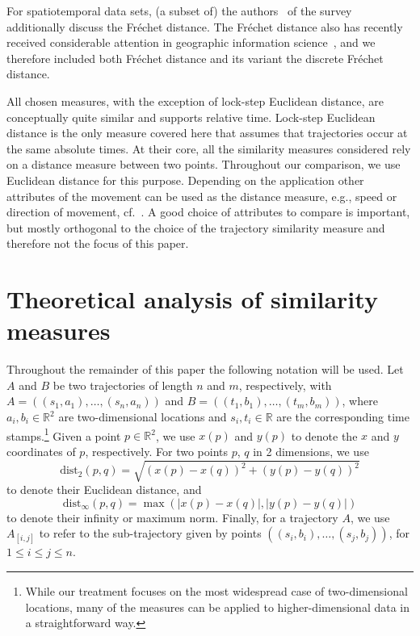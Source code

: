 \documentclass{interact}
\newcommand{\R}{\ensuremath{\mathbb{R}}}
\newcommand{\dist}{\ensuremath{\text{dist}}}
\begin{document}
For spatiotemporal data sets, (a subset of) the authors~\citep{gunopulos2012similarity} of the survey additionally discuss the Fr\'echet distance. The Fr\'echet distance also has recently received considerable attention in geographic information science~\citep{werner2018acm}, and we therefore included both Fr\'echet distance and its variant the discrete Fr\'echet distance.


All chosen measures, with the exception of lock-step Euclidean distance, are conceptually quite similar and supports relative time. Lock-step Euclidean distance is the only measure covered here that assumes that trajectories occur at the same absolute times. At their core, all the similarity measures considered rely on a distance measure between two points. Throughout our comparison, we use Euclidean distance for this purpose. Depending on the application other attributes of the movement can be used as the distance measure, e.g., speed or direction of movement, cf.~\cite{konzack2017visual}. A good choice of attributes to compare is important, but mostly orthogonal to the choice of the trajectory similarity measure and therefore not the focus of this paper.




\section{Theoretical analysis of similarity measures}

Throughout the remainder of this paper the following notation will be used. Let $A$ and $B$ be two trajectories of length $n$ and $m$, respectively, with $A=((s_1,a_1),\dots, (s_n,a_n))$ and $B=((t_1,b_1),\dots, (t_m,b_m))$, where $a_i,b_i \in \R^2$ are two-dimensional locations and $s_i, t_i \in \R$ are the corresponding time stamps.\footnote{While our treatment focuses on the most widespread case of two-dimensional locations, many of the measures can be applied to higher-dimensional data in a straightforward way.}
Given a point $p \in \R^2$, we use $x(p)$ and $y(p)$ to denote the $x$ and $y$ coordinates of $p$, respectively. For two points $p$, $q$ in 2 dimensions, we use 
$$\dist_2(p,q)=\sqrt {(x(p)-x(q))^2+(y(p)-y(q))^2}$$ 
to denote their Euclidean distance, and 
$$\dist_\infty(p,q)=\max(|x(p)-x(q)|,|y(p)-y(q)|)$$  
to denote their infinity or maximum norm. Finally, for a trajectory $A$, we use $A_{[i,j]}$ to refer to the sub-trajectory given by points $((s_i,b_i),\dots, (s_j,b_j))$, for $1 \leq i \leq j \leq n$.
\end{document}
